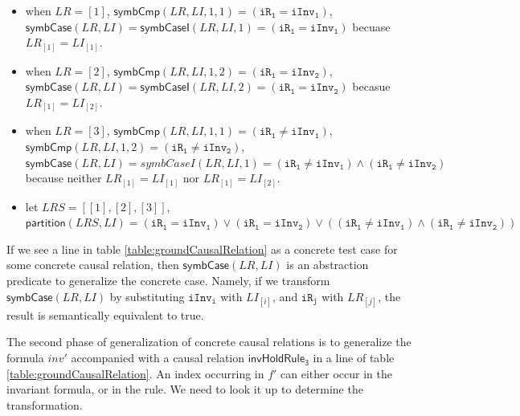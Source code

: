 \documentclass[final]{IEEEtran}
\def \eqc {=}
\def \iInv {iInv}
\def \iR {iR}
\begin{document}
{\begin{itemize}
  \item when $LR=[1]$, $\mathsf{symbCmp}(LR,LI,1,1)=(\mathtt{\iR_1} \eqc \mathtt{\iInv_1})$, $\mathsf{symbCase}(LR,LI)=\mathsf{symbCaseI}(LR,LI,1)=(\mathtt{\iR_1} \eqc \mathtt{\iInv_1})$ becuase $LR_{[1]}=LI_{[1]}$.

  \item when $LR=[2]$, $\mathsf{symbCmp}(LR,LI,1,2)= (\mathtt{\iR_1} \eqc \mathtt{\iInv_2})$, $\mathsf{symbCase}(LR,LI)=\mathsf{symbCaseI}(LR,LI,2)=(\mathtt{\iR_1} \eqc \mathtt{\iInv_2})$ becasue $LR_{[1]}=LI_{[2]}$.


 \item when  $LR=[3]$, $\mathsf{symbCmp}(LR,LI,1,1)=(\mathtt{\iR_1} \ne \mathtt{\iInv_1})$, $\mathsf{symbCmp}(LR,LI,1,2) = (\mathtt{\iR_1} \ne \mathtt{\iInv_2})$, $\mathsf{symbCase}(LR,LI)=symbCaseI(LR,LI,1)= (\mathtt{\iR_1} \ne \mathtt{\iInv_1}) \wedge  (\mathtt{\iR_1} \ne \mathtt{\iInv_2})$ because neither $LR_{[1]}=LI_{[1]}$ nor $LR_{[1]}=LI_{[2]}$.

  \item let $LRS=[[1],[2],[3]]$, $\mathsf{partition}(LRS,LI)= (\mathtt{\iR_1} \eqc \mathtt{\iInv_1}) \vee (\mathtt{\iR_1} \eqc \mathtt{\iInv_2}) \vee ( (\mathtt{\iR_1} \ne \mathtt{\iInv_1}) \wedge  (\mathtt{\iR_1} \ne \mathtt{\iInv_2}))$
\end{itemize}

If we see a line  in table \ref{table:groundCausalRelation} as a concrete test case for some concrete causal relation,  then $\mathsf{symbCase}(LR, LI)$ is an abstraction predicate to generalize the concrete case. Namely, if we transform $\mathsf{symbCase}(LR, LI)$ by substituting $\mathtt{\iInv_i}$ with $LI_{[i]}$, and $\mathtt{\iR_j}$ with $LR_{[j]}$, the result is semantically equivalent to true. %

The second phase of generalization of concrete causal relations is to generalize the formula $inv'$ accompanied with a causal relation $\mathsf{invHoldRule_3}$ in a line of table \ref{table:groundCausalRelation}. An index occurring in $f'$ can either  occur in the invariant formula, or in the rule. We need to look it up to determine the  transformation.

}
\end{document}
